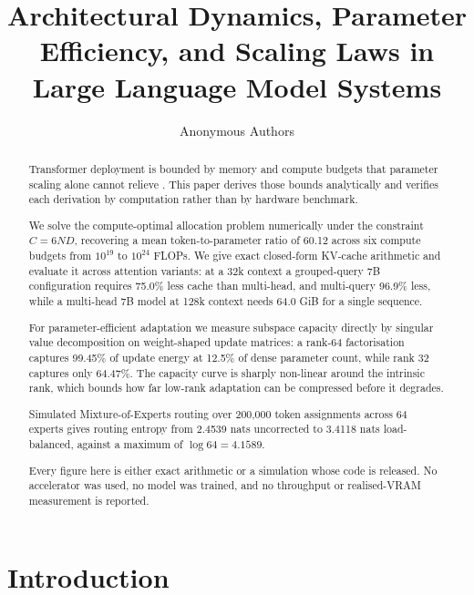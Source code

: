 \documentclass[11pt,a4paper]{article}
\begin{document}
\title{Architectural Dynamics, Parameter Efficiency, and Scaling Laws in Large Language Model Systems}

\author{
Anonymous Authors
}

\maketitle

\begin{abstract}
Transformer deployment is bounded by memory and compute budgets that parameter scaling alone cannot relieve \cite{arxiv_2005_14165,arxiv_2406_00584}. This paper derives those bounds analytically and verifies each derivation by computation rather than by hardware benchmark.

We solve the compute-optimal allocation problem numerically under the constraint $C = 6ND$, recovering a mean token-to-parameter ratio of 60.12 across six compute budgets from $10^{19}$ to $10^{24}$ FLOPs. We give exact closed-form KV-cache arithmetic and evaluate it across attention variants: at a 32k context a grouped-query 7B configuration requires 75.0\% less cache than multi-head, and multi-query 96.9\% less, while a multi-head 7B model at 128k context needs 64.0 GiB for a single sequence.

For parameter-efficient adaptation we measure subspace capacity directly by singular value decomposition on weight-shaped update matrices: a rank-64 factorisation captures 99.45\% of update energy at 12.5\% of dense parameter count, while rank 32 captures only 64.47\%. The capacity curve is sharply non-linear around the intrinsic rank, which bounds how far low-rank adaptation can be compressed before it degrades.

Simulated Mixture-of-Experts routing over 200{,}000 token assignments across 64 experts gives routing entropy from 2.4539 nats uncorrected to 3.4118 nats load-balanced, against a maximum of $\log 64 = 4.1589$.

Every figure here is either exact arithmetic or a simulation whose code is released. No accelerator was used, no model was trained, and no throughput or realised-VRAM measurement is reported.
\end{abstract}






\section{Introduction}
\end{document}
